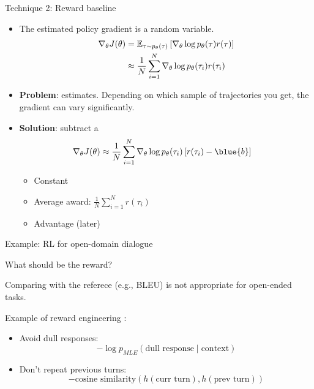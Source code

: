 \documentclass[usenames,dvipsnames,notes,11pt,aspectratio=169,hyperref={colorlinks=true, linkcolor=blue}]{beamer}
\begin{document}
\begin{frame}
    {Technique 2: Reward baseline}
    \begin{itemize}
        \item The estimated policy gradient is a random variable.
            \begin{align*}
                \nabla_\theta J(\theta) &= \mathbb{E}_{\tau\sim p_\theta(\tau)}\left[ \nabla_\theta \log p_\theta(\tau) r(\tau) \right]\\
                &\approx \frac{1}{N}\sum_{i=1}^N \nabla_\theta \log p_\theta(\tau_i) r(\tau_i) 
            \end{align*}
        \item {\bf Problem}:  estimates. Depending on which sample of trajectories you get, the gradient can vary significantly.
            \pause
        \item {\bf Solution}: subtract a 
            \vspace{-1em}
            \begin{align*}
                \nabla_\theta J(\theta) 
                &\approx \frac{1}{N}\sum_{i=1}^N \nabla_\theta \log p_\theta(\tau_i) \pb{r(\tau_i) - \blue{b}}
            \end{align*}
            \vspace{-1em}
            \begin{itemize}
                \item Constant
                \item Average award: $\frac{1}{N}\sum_{i=1}^N r(\tau_i)$ 
                \item Advantage (later) 
            \end{itemize}
    \end{itemize}
\end{frame}

\begin{frame}
    {Example: RL for open-domain dialogue}

    What should be the reward?

    Comparing with the referece (e.g., BLEU) is not appropriate for open-ended tasks.

    \pause
    Example of reward engineering :
    \begin{itemize}
        \item Avoid dull responses:
            $$
            -\log p_{MLE}(\text{dull response} \mid \text{context})
            $$
        \item Don't repeat previous turns:
            $$
            -\text{cosine similarity}(h(\text{curr turn}), h(\text{prev turn}))
            $$
    \end{itemize}
\end{frame}
\end{document}
